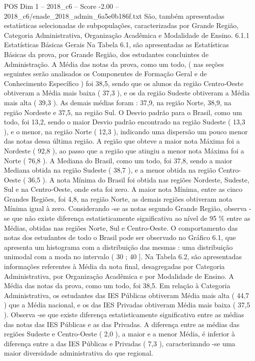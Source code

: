 \begin{textsample}{POS Dim 1 – 2018\_c6 – Score -2.00 – 2018\_c6/enade\_2018\_admin\_6a5e0b186f.txt}
São, também apresentadas estatísticas selecionadas de subpopulações, caracterizadas por Grande Região, Categoria Administrativa, Organização Acadêmica e Modalidade de Ensino. 6.1.1 Estatísticas Básicas Gerais Na Tabela 6.1, são apresentadas as Estatísticas Básicas da prova, por Grande Região, dos estudantes concluintes de Administração.
A Média das notas da prova, como um todo, ( nas seções seguintes serão analisados os Componentes de Formação Geral e de Conhecimento Específico ) foi 38,5, sendo que os alunos da região Centro-Oeste obtiveram a Média mais baixa ( 37,3 ), e os da região Sudeste obtiveram a Média mais alta ( 39,3 ).
As demais médias foram : 37,9, na região Norte, 38,9, na região Nordeste e 37,5, na região Sul.
O Desvio padrão para o Brasil, como um todo, foi 13,2, sendo o maior Desvio padrão encontrado na região Sudeste ( 13,3 ), e o menor, na região Norte ( 12,3 ), indicando uma dispersão um pouco menor das notas dessa última região.
A região que obteve a maior nota Máxima foi a Nordeste ( 92,8 ), ao passo que a região que atingiu a menor nota Máxima foi a Norte ( 76,8 ).
A Mediana do Brasil, como um todo, foi 37,8, sendo a maior Mediana obtida na região Sudeste ( 38,7 ), e a menor obtida na região Centro-Oeste ( 36,5 ).
A nota Mínima do Brasil foi obtida nas regiões Nordeste, Sudeste, Sul e na Centro-Oeste, onde esta foi zero.
A maior nota Mínima, entre as cinco Grandes Regiões, foi 4,8, na região Norte, as demais regiões obtiveram nota Mínima igual à zero.
Considerando -se as notas segundo Grande Região, observa -se que não existe diferença estatisticamente significativa ao nível de 95 \% entre as Médias, obtidas nas regiões Norte, Sul e Centro-Oeste.
O comportamento das notas dos estudantes de todo o Brasil pode ser observado no Gráfico 6.1, que apresenta um histograma com a distribuição das mesmas : uma distribuição unimodal com a moda no intervalo ( 30 ; 40 ].
Na Tabela 6.2, são apresentadas informações referentes à Média da nota final, desagregadas por Categoria Administrativa, por Organização Acadêmica e por Modalidade de Ensino.
A Média das notas da prova, como um todo, foi 38,5.
Em relação à Categoria Administrativa, os estudantes das IES Públicas obtiveram Média mais alta ( 44,7 ) que a Média nacional, e os das IES Privadas obtiveram Média mais baixa ( 37,5 ).
Observa -se que existe diferença estatisticamente significativa entre as médias das notas das IES Públicas e as das Privadas.
A diferença entre as médias das regiões Sudeste e Centro-Oeste ( 2,0 ), a maior e a menor Média, é inferior à diferença entre a das IES Públicas e Privadas ( 7,3 ), caracterizando -se uma maior diversidade administrativa do que regional.

\end{textsample}

